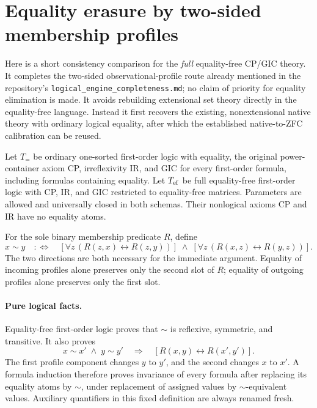 \section{Equality erasure by two-sided membership profiles}
\label{sec:equality-erasure}

Here is a short consistency comparison for the \emph{full} equality-free
CP/GIC theory.  It completes the two-sided observational-profile route
already mentioned in the repository's \texttt{logical\_engine\_completeness.md};
no claim of priority for equality elimination is made.  It avoids rebuilding
extensional set theory directly in the equality-free language.  Instead it
first recovers the existing, nonextensional native theory with ordinary
logical equality, after which the established native-to-ZFC calibration
can be reused.

Let $T_{=}$ be ordinary one-sorted first-order logic with equality, the
original power-container axiom CP, irreflexivity IR, and GIC for every
first-order formula, including formulas containing equality.  Let $T_{\rm ef}$
be full equality-free first-order logic with CP, IR, and GIC restricted to
equality-free matrices.  Parameters are allowed and universally closed in
both schemas.  Their nonlogical axioms CP and IR have no equality atoms.

For the sole binary membership predicate $R$, define
\[
 x\sim y\quad:\!\!\Longleftrightarrow\quad
 [\forall z\,(R(z,x)\leftrightarrow R(z,y))]
 \;\land\;
 [\forall z\,(R(x,z)\leftrightarrow R(y,z))].
\]
The two directions are both necessary for the immediate argument.  Equality
of incoming profiles alone preserves only the second slot of $R$; equality
of outgoing profiles alone preserves only the first slot.

\paragraph{Pure logical facts.}
Equality-free first-order logic proves that $\sim$ is reflexive, symmetric,
and transitive.  It also proves
\[
 x\sim x'\;\land\;y\sim y'
 \quad\Longrightarrow\quad
 [R(x,y)\leftrightarrow R(x',y')].
\]
The first profile component changes $y$ to $y'$, and the second changes
$x$ to $x'$.  A formula induction therefore proves invariance of every
formula after replacing its equality atoms by $\sim$, under replacement
of assigned values by $\sim$-equivalent values.  Auxiliary quantifiers in
this fixed definition are always renamed fresh.

